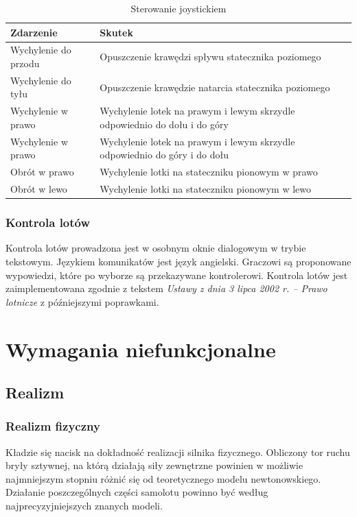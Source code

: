 \documentclass{mwrep}
\begin{document}
\begin{center}
\begin{table}[ht]
\begin{center}
\begin{tabularx}{1\textwidth}{|l|X|}
\hline
Zdarzenie & Skutek \\ \hline
Wychylenie do przodu & Opuszczenie krawędzi spływu statecznika poziomego \\
Wychylenie do tyłu & Opuszczenie krawędzie natarcia statecznika poziomego \\
Wychylenie w prawo & Wychylenie lotek na prawym i lewym skrzydle odpowiednio do dołu i do góry \\
Wychylenie w prawo & Wychylenie lotek na prawym i lewym skrzydle odpowiednio do góry i do dołu \\
Obrót w prawo & Wychylenie lotki na stateczniku pionowym w prawo \\
Obrót w lewo & Wychylenie lotki na stateczniku pionowym w lewo \\
\hline
\end{tabularx}
\end{center}
\vspace{3ex}
\caption{Sterowanie joystickiem}\label{T:Sterowanie_joystickiem}
\end{table}
\end{center}

\subsection{Kontrola lotów}

Kontrola lotów prowadzona jest w osobnym oknie dialogowym w trybie tekstowym. Językiem komunikatów jest język angielski. Graczowi są proponowane wypowiedzi, które po wyborze są przekazywane kontrolerowi. Kontrola lotów jest zaimplementowana zgodnie z tekstem \emph{Ustawy z dnia 3 lipca 2002 r. -- Prawo lotnicze} z późniejszymi poprawkami.

\chapter{Wymagania niefunkcjonalne}

\section{Realizm}
\subsection{Realizm fizyczny}
Kładzie się nacisk na dokładność realizacji silnika fizycznego. Obliczony tor ruchu bryły sztywnej, na którą działają siły zewnętrzne powinien w możliwie najmniejszym stopniu różnić się od teoretycznego modelu newtonowskiego.\\
Działanie poszczególnych części samolotu powinno być według najprecyzyjniejszych znanych modeli.
\end{document}
